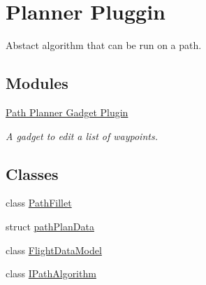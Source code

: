 \hypertarget{group___path}{\section{Planner Pluggin}
\label{group___path}
}


Abstact algorithm that can be run on a path.  


\subsection*{Modules}
\begin{DoxyCompactItemize}
\item 
\hyperlink{group___path_planner_gadget_plugin}{Path Planner Gadget Plugin}
\begin{DoxyCompactList}\small\item\em A gadget to edit a list of waypoints. \end{DoxyCompactList}\end{DoxyCompactItemize}
\subsection*{Classes}
\begin{DoxyCompactItemize}
\item 
class \hyperlink{class_path_fillet}{Path\-Fillet}
\item 
struct \hyperlink{structpath_plan_data}{path\-Plan\-Data}
\item 
class \hyperlink{class_flight_data_model}{Flight\-Data\-Model}
\item 
class \hyperlink{class_i_path_algorithm}{I\-Path\-Algorithm}
\end{DoxyCompactItemize}
